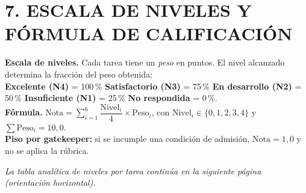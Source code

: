 \documentclass[11pt]{article}
\begin{document}
\section*{\textcolor{utegreendk}{7. ESCALA DE NIVELES Y FÓRMULA DE CALIFICACIÓN}}

\noindent\colorbox{boxgray}{\parbox{\dimexpr\linewidth-2\fboxsep}{\small
\textbf{Escala de niveles.} Cada tarea tiene un \emph{peso} en puntos. El nivel alcanzado determina la fracción del peso obtenida:\\[2pt]
\colorbox{lvlexc}{\textbf{Excelente (N4)} = 100\,\%}\quad
\colorbox{lvlsat}{\textbf{Satisfactorio (N3)} = 75\,\%}\quad
\colorbox{lvldev}{\textbf{En desarrollo (N2)} = 50\,\%}\quad
\colorbox{lvlins}{\textbf{Insuficiente (N1)} = 25\,\%}\quad
\textbf{No respondida} = 0\,\%.\\[4pt]
\textbf{Fórmula.}\;
$\text{Nota} = \sum_{i=1}^{6} \dfrac{\text{Nivel}_i}{4} \times \text{Peso}_i$,\;
con $\text{Nivel}_i \in \{0,1,2,3,4\}$ y $\sum \text{Peso}_i = 10{,}0$.\\[2pt]
\textbf{Piso por gatekeeper:} si se incumple una condición de admisión, $\text{Nota} = 1{,}0$ y no se aplica la rúbrica.
}}

\vspace{6pt}
\begin{center}
\textit{\small La tabla analítica de niveles por tarea continúa en la siguiente página (orientación horizontal).}
\end{center}
\end{document}
